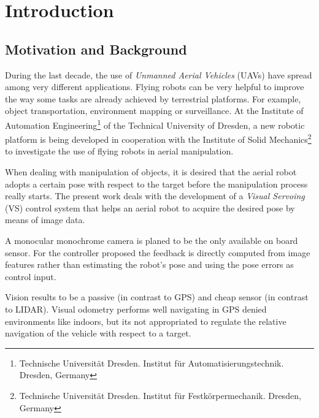 
\chapter{Introduction}
\label{chap:introduction}

\section{Motivation and Background}
\label{sec:motivation-brackground}

During the last decade, the use of \emph{Unmanned Aerial Vehicles} (UAVs) have spread among very different applications. Flying robots can be very helpful to improve the way some tasks are already achieved by terrestrial platforms. For example, object transportation, environment mapping or surveillance. At the Institute of Automation Engineering\footnote{Technische Universität Dresden. Institut für Automatisierungstechnik. Dresden, Germany} of the Technical University of Dresden, a new robotic platform is being developed in cooperation with the Institute of Solid Mechanics\footnote{Technische Universität Dresden. Institut für Festkörpermechanik. Dresden, Germany} to investigate the use of flying robots in aerial manipulation.


When dealing with manipulation of objects, it is desired that the aerial robot adopts a certain pose with respect to the target before the manipulation process really starts. The present work deals with the development of a \emph{Visual Servoing} (VS) control system that helps an aerial robot to acquire the desired pose by means of image data.


A monocular monochrome camera is planed to be the only available on board sensor. For the controller proposed the feedback is directly computed from image features rather than estimating the robot’s pose and using the pose errors as control input.


Vision results to be a passive (in contrast to GPS) and cheap sensor (in contrast to LIDAR). Visual odometry performs well navigating in GPS denied environments like indoors, but its not appropriated to regulate the relative navigation of the vehicle with respect to a target.  

